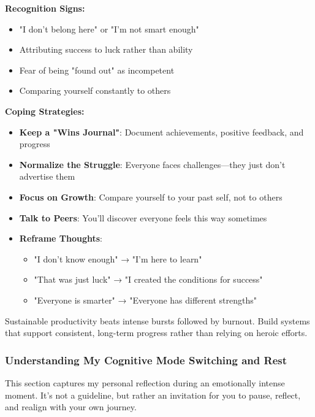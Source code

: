 \documentclass[11pt,a4paper]{article}
\begin{document}
\textbf{Recognition Signs:}
\begin{itemize}
    \item "I don't belong here" or "I'm not smart enough"
    \item Attributing success to luck rather than ability
    \item Fear of being "found out" as incompetent
    \item Comparing yourself constantly to others
\end{itemize}

\textbf{Coping Strategies:}
\begin{itemize}
    \item \textbf{Keep a "Wins Journal"}: Document achievements, positive feedback, and progress
    \item \textbf{Normalize the Struggle}: Everyone faces challenges—they just don't advertise them
    \item \textbf{Focus on Growth}: Compare yourself to your past self, not to others
    \item \textbf{Talk to Peers}: You'll discover everyone feels this way sometimes
    \item \textbf{Reframe Thoughts}: 
    \begin{itemize}
        \item "I don't know enough" → "I'm here to learn"
        \item "That was just luck" → "I created the conditions for success"
        \item "Everyone is smarter" → "Everyone has different strengths"
    \end{itemize}
\end{itemize}

\begin{tcolorbox}[colback=yellow!10,colframe=red!50,title={Remember: PhD is a Marathon, Not a Sprint}]
Sustainable productivity beats intense bursts followed by burnout. Build systems that support consistent, long-term progress rather than relying on heroic efforts.
\end{tcolorbox}

\subsubsection{Understanding My Cognitive Mode Switching and Rest}

\begin{tcolorbox}[colback=blue!5,colframe=blue!40,title={Author's Note}]
This section captures my personal reflection during an emotionally intense moment. It's not a guideline, but rather an invitation for you to pause, reflect, and realign with your own journey.
\end{tcolorbox}
\end{document}
